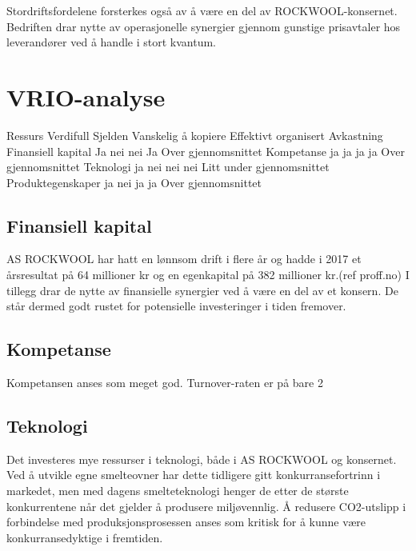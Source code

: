 \indent \newline
Stordriftsfordelene forsterkes også av å være en del av ROCKWOOL-konsernet. Bedriften drar nytte av operasjonelle synergier gjennom gunstige prisavtaler hos leverandører ved å handle i stort kvantum.

\section{VRIO-analyse}

Ressurs
Verdifull
Sjelden
Vanskelig å kopiere
Effektivt organisert
Avkastning
Finansiell kapital
Ja
nei
nei
Ja
Over gjennomsnittet
Kompetanse
ja
ja
ja
ja
Over gjennomsnittet
Teknologi
ja
nei
nei
nei
Litt under gjennomsnittet
Produktegenskaper
ja
nei
ja
ja
Over gjennomsnittet

\subsection{Finansiell kapital}
AS ROCKWOOL har hatt en lønnsom drift i flere år og hadde i 2017 et årsresultat på 64 millioner kr og en egenkapital på 382 millioner kr.(ref proff.no) I tillegg drar de nytte av finansielle synergier ved å være en del av et konsern. De står dermed godt rustet for potensielle investeringer i tiden fremover.

\subsection{Kompetanse}
Kompetansen anses som meget god. Turnover-raten er på bare 2%

\subsection{Teknologi}
Det investeres mye ressurser i teknologi, både i AS ROCKWOOL og konsernet. Ved å utvikle egne smelteovner har dette tidligere gitt konkurransefortrinn i markedet, men med dagens smelteteknologi henger de etter de største konkurrentene når det gjelder å produsere miljøvennlig. Å redusere CO2-utslipp i forbindelse med produksjonsprosessen anses som kritisk for å kunne være konkurransedyktige i fremtiden.

